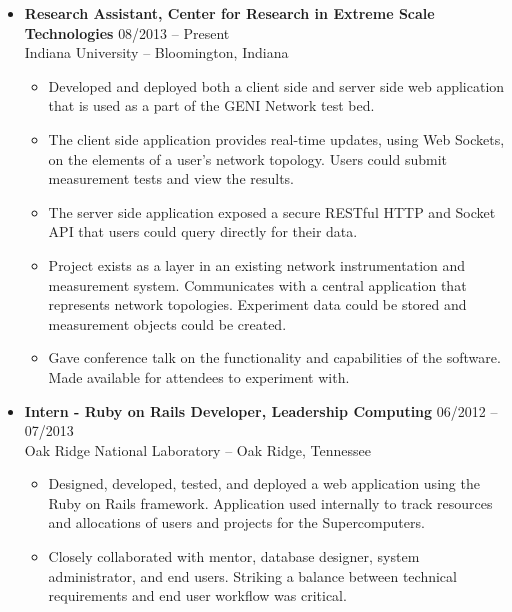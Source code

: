 \documentclass[12pt,letterpaper]{article}
\begin{document}
\begin{itemize}

\item \textbf{Research Assistant, Center for Research in Extreme Scale Technologies}
\hfill{08/2013 -- Present} \\
Indiana University -- Bloomington, Indiana

\begin{itemize}

  \item Developed and deployed both a client side and server side web
  application that is used as a part of the GENI Network test bed.

  \item The client side application provides real-time updates, using Web Sockets,
  on the elements of a user's network topology. Users could submit measurement
  tests and view the results.

  \item The server side application exposed a secure RESTful HTTP and
  Socket API that users could query directly for their data.

  \item Project exists as a layer in an existing network instrumentation and
  measurement system. Communicates with a central application that represents
  network topologies. Experiment data could be stored and measurement objects
  could be created.

  \item Gave conference talk on the functionality and capabilities of the software.
  Made available for attendees to experiment with.

\end{itemize}


\item \textbf{Intern - Ruby on Rails Developer, Leadership Computing}
\hfill{06/2012 -- 07/2013} \\
Oak Ridge National Laboratory -- Oak Ridge, Tennessee

\begin{itemize}

	\item Designed, developed, tested, and deployed a web application using the Ruby
	on Rails framework. Application used internally to track resources and allocations
  of users and projects for the Supercomputers.

  \item Closely collaborated with mentor, database designer, system administrator, and end users.
  Striking a balance between technical requirements and end user workflow was critical.


\end{itemize}
\end{itemize}
\end{document}
